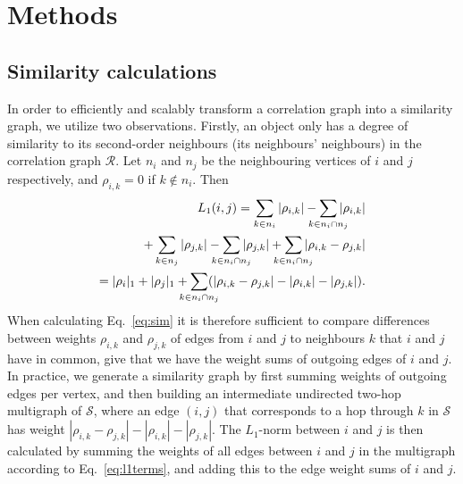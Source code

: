 \documentclass[conference]{IEEEtran}
\newcommand{\rn}[1]{\rho_{#1}}
\newcommand{\rns}[1]{|\rn{#1}|_1}
\newcommand{\nm}[1]{L_1(#1)}
\begin{document}
\section{Methods}
\label{sec:methods}


\subsection{Similarity calculations}
\label{sec:similaritycalculations}

In order to efficiently and scalably transform a correlation graph into a similarity graph, we utilize two observations. 
Firstly, an object only has a degree of similarity to its second-order
neighbours (its neighbours' neighbours) in the
correlation graph $\mathcal{R}$. Let $n_i$ and $n_j$ be the neighbouring vertices of $i$ and $j$ respectively, and $\rn{i,
k} = 0$ if $k \not\in n_i$. Then
\begin{eqnarray}
\nm{i,j}  =
\sum_{k \in n_i}  |\rn{i, k}| -  \sum_{\mathclap{k \in n_i \cap n_j}}  |\rn{i, k}| \notag\\
+  \sum_{k \in n_j}  |\rn{j, k}| -  \sum_{\mathclap{k \in n_i \cap n_j}}  |\rn{j, k}|
+  \sum_{\mathclap{k \in n_i \cap n_j}} |\rn{i, k} - \rn{j, k}| \notag\\
=  \rns{i} + \rns{j} + \sum_{\mathclap{k \in n_i \cap n_j}} (|\rn{i, k} - \rn{j, k}| - |\rn{i, k}| - |\rn{j, k}|). \label{eq:l1terms}
\end{eqnarray}
When calculating Eq.\ \ref{eq:sim} it is therefore sufficient to compare differences between weights $\rn{i, k}$ and
$\rn{j, k}$ of edges from $i$ and $j$ to neighbours $k$ that $i$ and $j$ have in common, give that we have the weight
sums of outgoing edges of $i$ and $j$.
In practice, we generate a similarity graph by first summing weights of outgoing edges per vertex, and then building an
intermediate undirected two-hop multigraph of $\mathcal{S}$, where an edge $(i, j)$ that corresponds to a hop through
$k$ in $\mathcal{S}$ has weight $|\rn{i, k} - \rn{j, k}| - |\rn{i, k}| - |\rn{j, k}|$. The $L_1$-norm between $i$ and
$j$ is then calculated by summing the weights of all edges between $i$ and $j$ in the multigraph according to Eq.\
\ref{eq:l1terms}, and adding this to the edge weight sums of $i$ and $j$.
\end{document}
